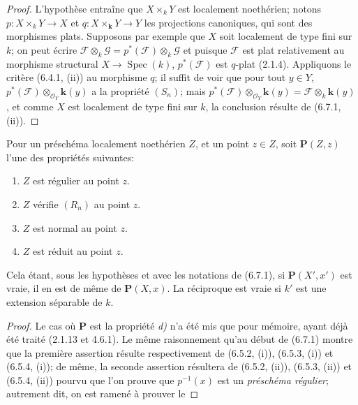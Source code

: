 \begin{proof}
L'hypothèse entraîne que $X\times_kY$ est localement noethérien; notons
$p:X\times_kY\to X$ et $q:X\times_{\boldsymbol k}Y\to Y$ les projections canoniques,
qui sont des morphismes plats. Supposons par exemple que $X$ soit
localement de type fini sur $k$; on peut écrire
$\mathscr F\otimes_k\mathscr G=p^*(\mathscr F)\otimes_k\mathscr G$
et puisque $\mathscr F$ est plat relativement au morphisme structural
$X\to\operatorname{Spec}(k)$, $p^*(\mathscr F)$ est $q$-plat (2.1.4).
Appliquons le critère (6.4.1, (ii)) au morphisme $q$; il suffit de voir
que pour tout $y\in Y$, $p^*(\mathscr F)\otimes_{\mathcal O_Y}\boldsymbol{k}(y)$
a la propriété $(S_n)$; mais
$p^*(\mathscr F)\otimes_{\mathcal O_Y}\boldsymbol{k}(y)=\mathscr F\otimes_k \boldsymbol{k}(y)$,
et comme $X$ est localement de type fini sur $k$, la conclusion résulte
de (6.7.1, (ii)).
\end{proof}

\begin{proposition}[6.7.4]
\label{IV.2.s6.7.4-fr}
Pour un préschéma localement noethérien $Z$, et un point $z\in Z$,
soit $\boldsymbol{P}(Z,z)$ l'une des propriétés suivantes:
\begin{enumerate}
\item[\textup{a)}] $Z$ est régulier au point $z$.
\item[\textup{b)}] $Z$ vérifie $(R_n)$ au point $z$.
\item[\textup{c)}] $Z$ est normal au point $z$.
\item[\textup{d)}] $Z$ est réduit au point $z$.
\end{enumerate}
Cela étant, sous les hypothèses et avec les notations de \textup{(6.7.1)}, si
$\boldsymbol{P}(X',x')$ est vraie, il en est de même de $\boldsymbol{P}(X,x)$. La réciproque est
vraie si $k'$ est une extension séparable de $k$.
\end{proposition}

\begin{proof}
Le cas où $\boldsymbol{P}$ est la propriété \emph{d)} n'a été mis que pour mémoire, ayant
déjà été traité (2.1.13 et 4.6.1). Le même raisonnement qu'au début
de (6.7.1) montre que la première assertion résulte
respectivement de (6.5.2, (i)), (6.5.3, (i)) et (6.5.4, (i)); de même,
la seconde assertion résultera de (6.5.2, (ii)), (6.5.3, (ii)) et
(6.5.4, (ii))
pourvu que l'on prouve que $p^{-1}(x)$ est un \emph{préschéma régulier}; autrement
dit, on est ramené à prouver le
\end{proof}

